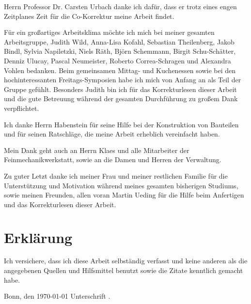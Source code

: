 \documentclass[
    11pt,
    ngerman
]{scrbook}
\begin{document}
    Herrn Professor Dr. Carsten Urbach danke ich dafür, dass er trotz eines engen Zeitplanes Zeit für die Co-Korrektur meine Arbeit findet.

    Für ein großartiges Arbeitsklima möchte ich mich bei meiner gesamten Arbeitsgruppe, Judith Wild, Anna-Lisa Kofahl, Sebastian Theilenberg, Jakob Bindl, Sylvia Napiletzki, Niels Räth, Björn Schemmann, Birgit Schu-Schätter, Denniz Ulucay, Pascal Neumeister, Roberto Correa-Schragen und Alexandra Vohlen bedanken. Beim gemeinsamen Mittag- und Kuchenessen sowie bei den hochinteressanten Freitags-Symposien habe ich mich von Anfang an als Teil der Gruppe gefühlt. Besonders Judith bin ich für das Korrekturlesen dieser Arbeit und die gute Betreuung während der gesamten Durchführung zu großem Dank verpflichtet.

    Ich danke Herrn Habenstein für seine Hilfe bei der Konstruktion von Bauteilen und für seinen Ratschläge, die meine Arbeit erheblich vereinfacht haben. 

    Mein Dank geht auch an Herrn Klaes und alle Mitarbeiter der Feinmechanikwerkstatt, sowie an die Damen und Herren der Verwaltung.

    Zu guter Letzt danke ich meiner Frau und meiner restlichen Familie für die Unterstützung und Motivation während meines gesamten bisherigen Studiums, sowie meinen Freunden, allen voran Martin Ueding für die Hilfe beim Anfertigen und das Korrekturlesen dieser Arbeit.

    \chapter*{Erklärung}

    Ich versichere, dass ich diese Arbeit selbständig verfasst und keine
    anderen als die angegebenen Quellen und Hilfsmittel benutzt sowie die
    Zitate kenntlich gemacht habe.

    \vspace{10ex}

    Bonn, den \today \hspace{3em} Unterschrift \hrulefill.


    
\end{document}
